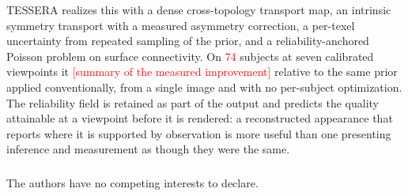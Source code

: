 \documentclass[runningheads]{llncs}
\newcommand{\PH}[1]{\textcolor{red}{#1}}
\begin{document}
TESSERA realizes this with a dense cross-topology transport map, an intrinsic
symmetry transport with a measured asymmetry correction, a per-texel
uncertainty from repeated sampling of the prior, and a reliability-anchored
Poisson problem on surface connectivity. On \PH{74} subjects at seven
calibrated viewpoints it \PH{[summary of the measured improvement]} relative to
the same prior applied conventionally, from a single image and with no
per-subject optimization. The reliability field is retained as part of the
output and predicts the quality attainable at a viewpoint before it is
rendered: a reconstructed appearance that reports where it is supported by
observation is more useful than one presenting inference and measurement as
though they were the same.

\begin{credits}
\subsubsection{\discintname}
The authors have no competing interests to declare.
\end{credits}
\end{document}
